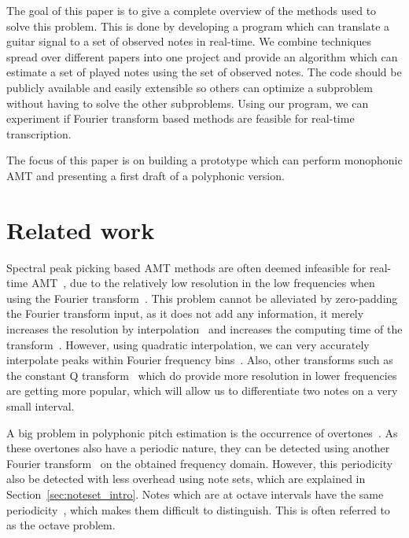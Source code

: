 \documentclass[10pt,twocolumn]{article}
\begin{document}
The goal of this paper is to give a complete overview of the methods used to solve this problem. This is done by developing a program which can translate a guitar signal to a set of observed notes in real-time. We combine techniques spread over different papers into one project and provide an algorithm which can estimate a set of played notes using the set of observed notes. The code should be publicly available and easily extensible so others can optimize a subproblem without having to solve the other subproblems. Using our program, we can experiment if Fourier transform based methods are feasible for real-time transcription.

The focus of this paper is on building a prototype which can perform monophonic AMT and presenting a first draft of a polyphonic version. 


\section{Related work}
Spectral peak picking based AMT methods are often deemed infeasible for real-time AMT~\cite{hater}, due to the relatively low resolution in the low frequencies when using the Fourier transform~\cite{theoretisch}. This problem cannot be alleviated by zero-padding the Fourier transform input, as it does not add any information, it merely increases the resolution by interpolation~\cite{infomax}\cite{infomax2} and increases the computing time of the transform~\cite{boek}. However, using quadratic interpolation, we can very accurately interpolate peaks within Fourier frequency bins~\cite{interpol}. Also, other transforms such as the constant Q transform~\cite{cqt} which do provide more resolution in lower frequencies are getting more popular, which will allow us to differentiate two notes on a very small interval.

A big problem in polyphonic pitch estimation is the occurrence of overtones~\cite{oud}. As these overtones also have a periodic nature, they can be detected using another Fourier transform~\cite{double} on the obtained frequency domain. However, this periodicity also be detected with less overhead using note sets, which are explained in Section~\ref{sec:noteset_intro}. Notes which are at octave intervals have the same periodicity~\cite{octave}, which makes them difficult to distinguish. This is often referred to as the octave problem.
\end{document}
